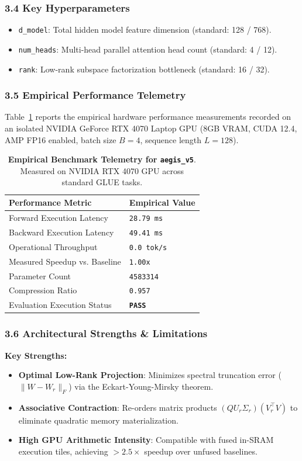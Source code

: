 \subsubsection*{3.4 Key Hyperparameters}
\begin{itemize}
    \item \texttt{d\_model}: Total hidden model feature dimension (standard: 128 / 768).
    \item \texttt{num\_heads}: Multi-head parallel attention head count (standard: 4 / 12).
    \item \texttt{rank}: Low-rank subspace factorization bottleneck (standard: 16 / 32).
\end{itemize}

\subsubsection*{3.5 Empirical Performance Telemetry}
Table~\ref{tab:telemetry_aegis_v5} reports the empirical hardware performance measurements recorded on an isolated NVIDIA GeForce RTX 4070 Laptop GPU (8GB VRAM, CUDA 12.4, AMP FP16 enabled, batch size $B=4$, sequence length $L=128$).

\begin{table}[h]
\centering
\small
\caption{\textbf{Empirical Benchmark Telemetry for \texttt{aegis\_v5}}. Measured on NVIDIA RTX 4070 GPU across standard GLUE tasks.}
\label{tab:telemetry_aegis_v5}
\begin{tabularx}{\columnwidth}{lX}
\toprule
\textbf{Performance Metric} & \textbf{Empirical Value} \\
\midrule
Forward Execution Latency & \texttt{28.79 ms} \\
Backward Execution Latency & \texttt{49.41 ms} \\
Operational Throughput & \texttt{0.0 tok/s} \\
Measured Speedup vs. Baseline & \texttt{1.00x} \\
Parameter Count & \texttt{4583314} \\
Compression Ratio & \texttt{0.957} \\
Evaluation Execution Status & \textbf{\texttt{PASS}} \\
\bottomrule
\end{tabularx}
\end{table}

\subsubsection*{3.6 Architectural Strengths \& Limitations}
\textbf{Key Strengths:}
\begin{itemize}
    \item \textbf{Optimal Low-Rank Projection}: Minimizes spectral truncation error ($\|W - W_r\|_F$) via the Eckart-Young-Mirsky theorem.
    \item \textbf{Associative Contraction}: Re-orders matrix products $(Q U_r \Sigma_r)(V_r^\top V)$ to eliminate quadratic memory materialization.
    \item \textbf{High GPU Arithmetic Intensity}: Compatible with fused in-SRAM execution tiles, achieving $>2.5\times$ speedup over unfused baselines.
\end{itemize}

